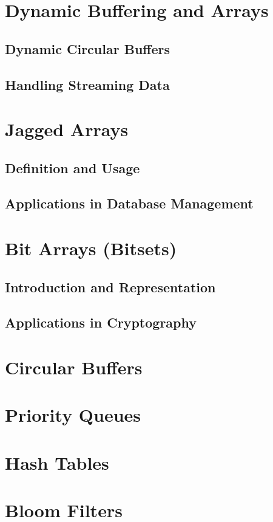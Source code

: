 \documentclass[12pt, oneside]{book}
\begin{document}
	\section{Dynamic Buffering and Arrays}
	\subsection{Dynamic Circular Buffers}
	\subsection{Handling Streaming Data}
	
	\section{Jagged Arrays}
	\subsection{Definition and Usage}
	\subsection{Applications in Database Management}
	
	\section{Bit Arrays (Bitsets)}
	\subsection{Introduction and Representation}
	\subsection{Applications in Cryptography}
	\section{Circular Buffers}
	\section{Priority Queues}
	\section{Hash Tables}
	\section{Bloom Filters}
\end{document}
